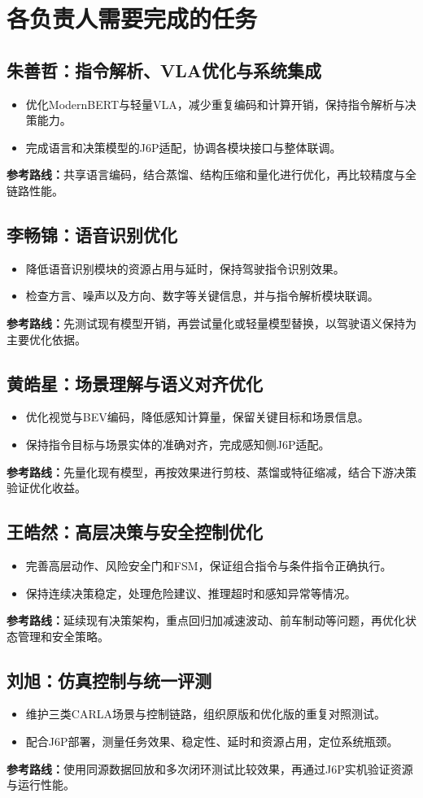 \documentclass[a4paper,11pt]{article}
\newcommand{\route}[1]{\noindent\textbf{参考路线：}#1\par}
\begin{document}
\clearpage
\section{各负责人需要完成的任务}
\subsection{朱善哲：指令解析、VLA优化与系统集成}
\begin{itemize}
\item 优化ModernBERT与轻量VLA，减少重复编码和计算开销，保持指令解析与决策能力。
\item 完成语言和决策模型的J6P适配，协调各模块接口与整体联调。
\end{itemize}
\route{共享语言编码，结合蒸馏、结构压缩和量化进行优化，再比较精度与全链路性能。}

\subsection{李畅锦：语音识别优化}
\begin{itemize}
\item 降低语音识别模块的资源占用与延时，保持驾驶指令识别效果。
\item 检查方言、噪声以及方向、数字等关键信息，并与指令解析模块联调。
\end{itemize}
\route{先测试现有模型开销，再尝试量化或轻量模型替换，以驾驶语义保持为主要优化依据。}

\subsection{黄皓星：场景理解与语义对齐优化}
\begin{itemize}
\item 优化视觉与BEV编码，降低感知计算量，保留关键目标和场景信息。
\item 保持指令目标与场景实体的准确对齐，完成感知侧J6P适配。
\end{itemize}
\route{先量化现有模型，再按效果进行剪枝、蒸馏或特征缩减，结合下游决策验证优化收益。}

\subsection{王皓然：高层决策与安全控制优化}
\begin{itemize}
\item 完善高层动作、风险安全门和FSM，保证组合指令与条件指令正确执行。
\item 保持连续决策稳定，处理危险建议、推理超时和感知异常等情况。
\end{itemize}
\route{延续现有决策架构，重点回归加减速波动、前车制动等问题，再优化状态管理和安全策略。}

\subsection{刘旭：仿真控制与统一评测}
\begin{itemize}
\item 维护三类CARLA场景与控制链路，组织原版和优化版的重复对照测试。
\item 配合J6P部署，测量任务效果、稳定性、延时和资源占用，定位系统瓶颈。
\end{itemize}
\route{使用同源数据回放和多次闭环测试比较效果，再通过J6P实机验证资源与运行性能。}
\end{document}
